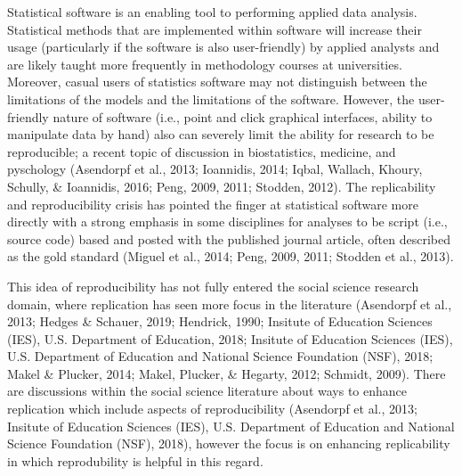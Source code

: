 \documentclass[english,,man]{apa6}
\begin{document}
Statistical software is an enabling tool to performing applied data analysis. Statistical methods that are implemented within software will increase their usage (particularly if the software is also user-friendly) by applied analysts and are likely taught more frequently in methodology courses at universities. Moreover, casual users of statistics software may not distinguish between the limitations of the models and the limitations of the software. However, the user-friendly nature of software (i.e., point and click graphical interfaces, ability to manipulate data by hand) also can severely limit the ability for research to be reproducible; a recent topic of discussion in biostatistics, medicine, and pyschology (Asendorpf et al., 2013; Ioannidis, 2014; Iqbal, Wallach, Khoury, Schully, \& Ioannidis, 2016; Peng, 2009, 2011; Stodden, 2012). The replicability and reproducibility crisis has pointed the finger at statistical software more directly with a strong emphasis in some disciplines for analyses to be script (i.e., source code) based and posted with the published journal article, often described as the gold standard (Miguel et al., 2014; Peng, 2009, 2011; Stodden et al., 2013).

This idea of reproducibility has not fully entered the social science research domain, where replication has seen more focus in the literature (Asendorpf et al., 2013; Hedges \& Schauer, 2019; Hendrick, 1990; Insitute of Education Sciences (IES), U.S. Department of Education, 2018; Insitute of Education Sciences (IES), U.S. Department of Education and National Science Foundation (NSF), 2018; Makel \& Plucker, 2014; Makel, Plucker, \& Hegarty, 2012; Schmidt, 2009). There are discussions within the social science literature about ways to enhance replication which include aspects of reproducibility (Asendorpf et al., 2013; Insitute of Education Sciences (IES), U.S. Department of Education and National Science Foundation (NSF), 2018), however the focus is on enhancing replicability in which reprodubility is helpful in this regard.
\end{document}
